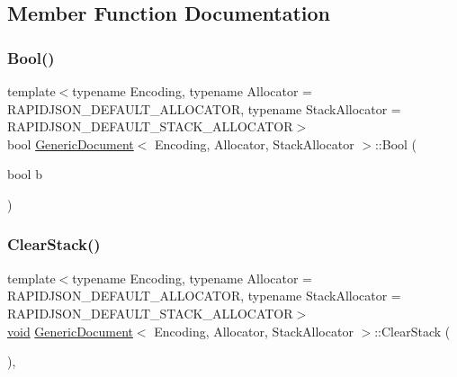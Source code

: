 \subsection{Member Function Documentation}
\mbox{\label{classGenericDocument_a4c44780642518dd34bd241a1ea0ceaf1}} 
\subsubsection{\texorpdfstring{Bool()}{Bool()}}
{\footnotesize\ttfamily template$<$typename Encoding, typename Allocator = R\+A\+P\+I\+D\+J\+S\+O\+N\+\_\+\+D\+E\+F\+A\+U\+L\+T\+\_\+\+A\+L\+L\+O\+C\+A\+T\+OR, typename Stack\+Allocator = R\+A\+P\+I\+D\+J\+S\+O\+N\+\_\+\+D\+E\+F\+A\+U\+L\+T\+\_\+\+S\+T\+A\+C\+K\+\_\+\+A\+L\+L\+O\+C\+A\+T\+OR$>$ \\
bool \hyperlink{classGenericDocument}{Generic\+Document}$<$ Encoding, Allocator, Stack\+Allocator $>$\+::Bool (\begin{DoxyParamCaption}\item[{bool}]{b }\end{DoxyParamCaption})\hspace{0.3cm}{\ttfamily [inline]}}

\mbox{\label{classGenericDocument_aa6f040219ed1d4cdd48f7ed9353942a4}} 
\subsubsection{\texorpdfstring{Clear\+Stack()}{ClearStack()}}
{\footnotesize\ttfamily template$<$typename Encoding, typename Allocator = R\+A\+P\+I\+D\+J\+S\+O\+N\+\_\+\+D\+E\+F\+A\+U\+L\+T\+\_\+\+A\+L\+L\+O\+C\+A\+T\+OR, typename Stack\+Allocator = R\+A\+P\+I\+D\+J\+S\+O\+N\+\_\+\+D\+E\+F\+A\+U\+L\+T\+\_\+\+S\+T\+A\+C\+K\+\_\+\+A\+L\+L\+O\+C\+A\+T\+OR$>$ \\
\hyperlink{imgui__impl__opengl3__loader_8h_ac668e7cffd9e2e9cfee428b9b2f34fa7}{void} \hyperlink{classGenericDocument}{Generic\+Document}$<$ Encoding, Allocator, Stack\+Allocator $>$\+::Clear\+Stack (\begin{DoxyParamCaption}{ }\end{DoxyParamCaption})\hspace{0.3cm}{\ttfamily [inline]}, {\ttfamily [private]}}

